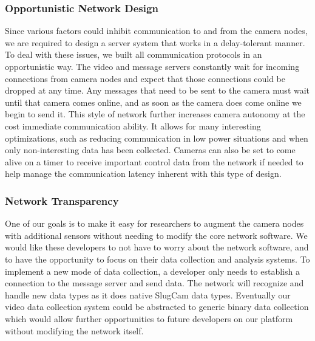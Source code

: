 


\subsubsection{Opportunistic Network Design}

Since various factors could inhibit communication to and from the camera nodes,
we are required to design a server system that works in a delay-tolerant manner.
To deal with these issues, we built all communication protocols in an
opportunistic way. The video and message servers constantly wait for incoming
connections from camera nodes and expect that those connections could be dropped
at any time. Any messages that need to be sent to the camera must wait until
that camera comes online, and as soon as the camera does come online we begin to
send it. This style of network further increases camera autonomy at the cost
immediate communication ability. It allows for many interesting optimizations,
such as reducing communication in low power situations and when only
non-interesting data has been collected. Cameras can also be set to come alive
on a timer to receive important control data from the network if needed to help
manage the communication latency inherent with this type of design.

\subsubsection{Network Transparency}

One of our goals is to make it easy for researchers to augment the camera nodes
with additional sensors without needing to modify the core network software. We
would like these developers to not have to worry about the network software, and
to have the opportunity to focus on their data collection and analysis systems.
To implement a new mode of data collection, a developer only needs to establish
a connection to the message server and send data. The network will recognize and
handle new data types as it does native SlugCam data types. Eventually our video
data collection system could be abstracted to generic binary data collection
which would allow further opportunities to future developers on our platform
without modifying the network itself.

